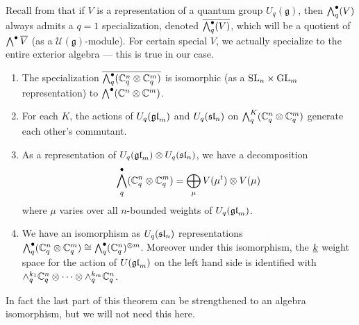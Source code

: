 \documentclass[10pt,leqno]{article}
\begin{document}
Recall from \cite{BZ} that if $ V $ is a representation of a quantum group $ U_q(\mathfrak{g}) $, then $ \Alt^\bullet_q(V) $ always admits a $ q=1 $ specialization, denoted $ \overline{\Alt^\bullet_q(V)}$, which will be a quotient of $ \Alt^\bullet \overline{V} $ (as a $\mathcal{U}(\mathfrak{g})$-module). For certain special $ V $, we actually specialize to the entire exterior algebra --- this is true in our case.

\begin{thm} \label{th:qSkewHowe}\mbox{}
\begin{enumerate}
\item The specialization $\overline{\Alt^\bullet_q(\bC_q^n \otimes \bC_q^m)} $ is isomorphic (as a $ \SL_n \times \GL_m $ representation) to $ \Alt^\bullet(\bC^n \otimes \bC^m) $.
\item For each $ K $, the actions of $ U_q(\gl_m) $ and $ U_q(\sl_n) $ on $ \Alt^K_q(\bC_q^n \otimes \bC_q^m) $ generate each other's commutant.
\item As a representation of $ U_q(\gl_m) \otimes U_q(\sl_n)  $, we have a decomposition
$$ \Alt^\bullet_q (\mathbb C^n_q \otimes \mathbb C^m_q) = \bigoplus_{\mu} V(\mu^t) \otimes V(\mu) $$
 where $\mu$ varies over all $n$-bounded weights of $ U_q(\gl_m)$.
\item We have an isomorphism as $ U_q(\sl_n) $ representations 
$ \Alt^\bullet_q(\mathbb C^n_q \otimes \mathbb C^m_q) \cong \Alt^\bullet_q(\bC_q^n)^{\otimes m} $.  Moreover under this isomorphism, the $ \ul{k} $ weight space for the action of $ U(\gl_m) $ on the left hand side is identified with $\alt^{k_1}_q \mathbb C_q^n \otimes \cdots \otimes \alt^{k_m}_q \mathbb C_q^n$.
\end{enumerate}
\end{thm}

In fact the last part of this theorem can be strengthened to an algebra isomorphism, but we will not need this here.
\end{document}
